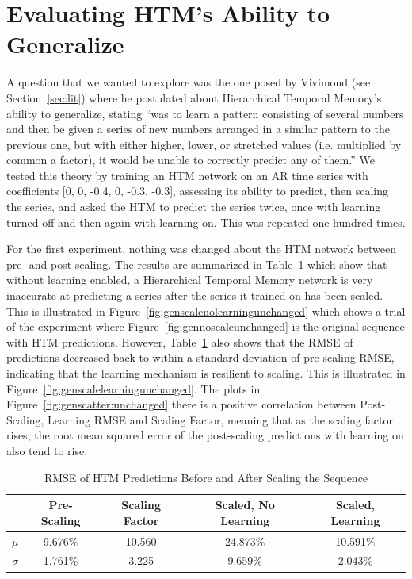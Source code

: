 \documentclass[oneside,12pt,openany]{book}
\begin{document}
   \section{Evaluating HTM's Ability to Generalize}
    
    A question that we wanted to explore was the one posed by Vivimond (see Section~\ref{sec:lit}) where he postulated about Hierarchical Temporal Memory's ability to generalize, stating ``was to learn a pattern consisting of several numbers and then be given a series of new numbers arranged in a similar pattern to the previous one, but with either higher, lower, or stretched values (i.e. multiplied by common a factor), it would be unable to correctly predict any of them.'' We tested this theory by training an HTM network on an AR time series with coefficients [0, 0, -0.4, 0, -0.3, -0.3], assessing its ability to predict, then scaling the series, and asked the HTM to predict the series twice, once with learning turned off and then again with learning on. This was repeated one-hundred times.
    
    For the first experiment, nothing was changed about the HTM network between pre- and post-scaling. The results are summarized in Table~\ref{tab:genscatter:unchanged} which show that without learning enabled, a Hierarchical Temporal Memory network is very inaccurate at predicting a series after the series it trained on has been scaled. This is illustrated in Figure~\ref{fig:genscalenolearningunchanged} which shows a trial of the experiment where Figure~\ref{fig:gennoscaleunchanged} is the original sequence with HTM predictions. However, Table~\ref{tab:genscatter:unchanged} also shows that the RMSE of predictions decreased back to within a standard deviation of pre-scaling RMSE, indicating that the learning mechanism is resilient to scaling. This is illustrated in Figure~\ref{fig:genscalelearningunchanged}. The plots in Figure~\ref{fig:genscatter:unchanged} there is a positive correlation between Post-Scaling, Learning RMSE and Scaling Factor, meaning that as the scaling factor rises, the root mean squared error of the post-scaling predictions with learning on also tend to rise.
    
    \begin{table}[hbt!]
        \centering
        \begin{tabular}{|c|c|c|c|c|}
            \hline
            \textbf{} & \textbf{Pre-Scaling} & \textbf{Scaling Factor} & \textbf{Scaled, No Learning} & \textbf{Scaled, Learning} \\ \hline
            \textbf{$\mu$} & 9.676\% & 10.560 & 24.873\% & 10.591\% \\ \hline
            \textbf{$\sigma$} & 1.761\% & 3.225 & 9.659\% & 2.043\% \\ \hline
        \end{tabular}\caption{RMSE of HTM Predictions Before and After Scaling the Sequence}
    \label{tab:genscatter:unchanged}
    \end{table}
\end{document}
